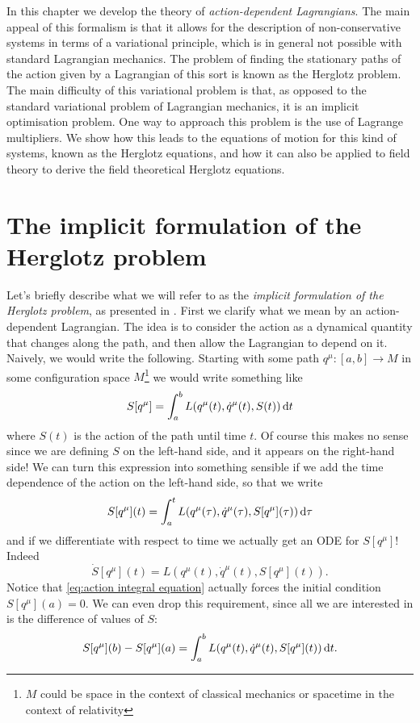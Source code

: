 \documentclass[../main.tex]{subfiles}
\begin{document}
In this chapter we develop the theory of \emph{action-dependent Lagrangians}. The main appeal of
this formalism is that it allows for the description of non-conservative systems in terms of a
variational principle, which is in general not possible with standard Lagrangian
mechanics. The problem of finding the stationary paths of the action given by a Lagrangian
of this sort is known as the Herglotz problem. The main difficulty of this variational
problem is that, as opposed to the standard variational problem of Lagrangian mechanics,
it is an implicit optimisation problem. One way to approach this problem is the use of
Lagrange multipliers. We show how this leads to the equations of motion for this kind of
systems, known as the Herglotz equations, and how it can also be applied to field theory
to derive the field theoretical Herglotz equations. 

\section{The implicit formulation of the Herglotz problem}
Let's briefly describe what we will refer to as the \emph{implicit formulation of the
Herglotz problem}, as presented in \cite{Lazo2018}. First we clarify what we mean by
an action-dependent Lagrangian. The idea is to consider the action as a dynamical quantity
that changes along the path, and then allow the Lagrangian to depend on it. Naively, we
would write the following. Starting with some path \( q^\mu \colon [a,b] \to M \) in some
configuration space \( M \)\footnote{\( M \) could be space in the context of classical
mechanics or spacetime in the context of relativity} we would
write something like
\begin{equation*}
	S[q^\mu] = \int_a^b L(q^\mu(t), \dot{q}^\mu(t), S(t)) \,\mathrm{d} t
\end{equation*}
where \( S(t) \) is the action of the path until time \( t \). Of course this makes no
sense since we are defining \( S \) on the left-hand side, and it appears on the
right-hand side! We can turn this expression into something sensible if we add the time
dependence of the action on the left-hand side, so that we write
\begin{equation}\label{eq:action integral equation}
	S[q^\mu](t) = \int_a^t L(q^\mu(\tau), \dot{q}^\mu(\tau), S[q^\mu](\tau)) \,\mathrm{d} \tau
\end{equation}
and if we differentiate with respect to time we actually get an ODE for \( S[q^\mu] \)!
Indeed
\begin{equation} \label{eq:action ode}
	\dot{S}[q^\mu](t) = L(q^\mu(t), \dot{q}^\mu(t), S[q^\mu](t)).
\end{equation}
Notice that \cref{eq:action integral equation} actually forces the initial condition \(
S[q^\mu](a) = 0 \). We can even drop this requirement, since all we are interested in is
the difference of values of \( S \):
\begin{equation}\label{eq:action density 1d}
	S[q^\mu](b) - S[q^\mu](a) = \int_a^b L(q^\mu(t), \dot{q}^\mu(t), S[q^\mu](t)) \,\mathrm{d} t. 
\end{equation}
\end{document}
